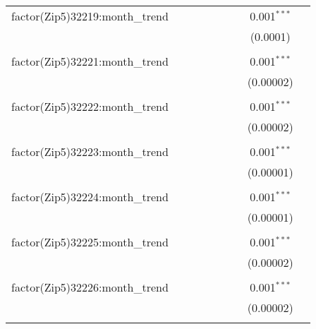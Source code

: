 \begin{table}[H]
{\begin{tabular}{@{\extracolsep{5pt}}lcccccccc}
  factor(Zip5)32219:month\_trend &  &  &  &  &  &  & 0.001$^{***}$ &  \\  

   &  &  &  &  &  &  & (0.0001) &  \\  

   & & & & & & & & \\  

  factor(Zip5)32221:month\_trend &  &  &  &  &  &  & 0.001$^{***}$ &  \\  

   &  &  &  &  &  &  & (0.00002) &  \\  

   & & & & & & & & \\  

  factor(Zip5)32222:month\_trend &  &  &  &  &  &  & 0.001$^{***}$ &  \\  

   &  &  &  &  &  &  & (0.00002) &  \\  

   & & & & & & & & \\  

  factor(Zip5)32223:month\_trend &  &  &  &  &  &  & 0.001$^{***}$ &  \\  

   &  &  &  &  &  &  & (0.00001) &  \\  

   & & & & & & & & \\  

  factor(Zip5)32224:month\_trend &  &  &  &  &  &  & 0.001$^{***}$ &  \\  

   &  &  &  &  &  &  & (0.00001) &  \\  

   & & & & & & & & \\  

  factor(Zip5)32225:month\_trend &  &  &  &  &  &  & 0.001$^{***}$ &  \\  

   &  &  &  &  &  &  & (0.00002) &  \\  

   & & & & & & & & \\  

  factor(Zip5)32226:month\_trend &  &  &  &  &  &  & 0.001$^{***}$ &  \\  

   &  &  &  &  &  &  & (0.00002) &  \\  

   & & & & & & & & \\  


\end{tabular}}
\end{table}
